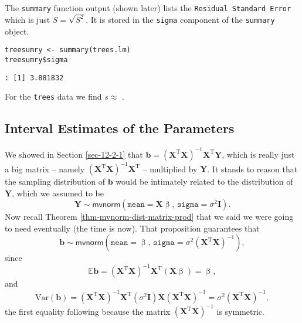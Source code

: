 The \texttt{summary} function output (shown later) lists the \texttt{Residual
Standard Error} which is just \(S=\sqrt{S^{2}}\). It is stored in the
\texttt{sigma} component of the \texttt{summary} object.

\begin{verbatim}
treesumry <- summary(trees.lm)
treesumry$sigma
\end{verbatim}

\begin{verbatim}
: [1] 3.881832
\end{verbatim}

For the \texttt{trees} data we find \(s \approx\) .

\subsection{Interval Estimates of the Parameters}
\label{sec-12-2-4}

We showed in Section \ref{sec-12-2-1} that
\(\mathbf{b}=\left(\mathbf{X}^{\mathrm{T}}\mathbf{X}\right)^{-1}\mathbf{X}^{\mathrm{T}}\mathbf{Y}\),
which is really just a big matrix -- namely
\(\left(\mathbf{X}^{\mathrm{T}}\mathbf{X}\right)^{-1}\mathbf{X}^{\mathrm{T}}\)
-- multiplied by \(\mathbf{Y}\). It stands to reason that the sampling
distribution of \(\mathbf{b}\) would be intimately related to the
distribution of \(\mathbf{Y}\), which we assumed to be
\begin{equation}
\mathbf{Y}\sim\mathsf{mvnorm}\left(\mathtt{mean}=\mathbf{X}\upbeta,\,\mathtt{sigma}=\sigma^{2}\mathbf{I}\right).
\end{equation}
Now recall Theorem \ref{thm-mvnorm-dist-matrix-prod} that we said we were
going to need eventually (the time is now). That proposition
guarantees that
\begin{equation}
\label{eq-distn-b-mlr}
\mathbf{b}\sim\mathsf{mvnorm}\left(\mathtt{mean}=\upbeta,\,\mathtt{sigma}=\sigma^{2}\left(\mathbf{X}^{\mathrm{T}}\mathbf{X}\right)^{-1}\right),
\end{equation}
since
\begin{equation}
\mathbb{E}\mathbf{b}=\left(\mathbf{X}^{\mathrm{T}}\mathbf{X}\right)^{-1}\mathbf{X}^{\mathrm{T}}(\mathbf{X}\upbeta)=\upbeta,
\end{equation}
and
\begin{equation}
\mbox{Var}(\mathbf{b})=\left(\mathbf{X}^{\mathrm{T}}\mathbf{X}\right)^{-1}\mathbf{X}^{\mathrm{T}}(\sigma^{2}\mathbf{I})\mathbf{X}\left(\mathbf{X}^{\mathrm{T}}\mathbf{X}\right)^{-1}=\sigma^{2}\left(\mathbf{X}^{\mathrm{T}}\mathbf{X}\right)^{-1},
\end{equation}
the first equality following because the matrix
\(\left(\mathbf{X}^{\mathrm{T}}\mathbf{X}\right)^{-1}\) is symmetric.

